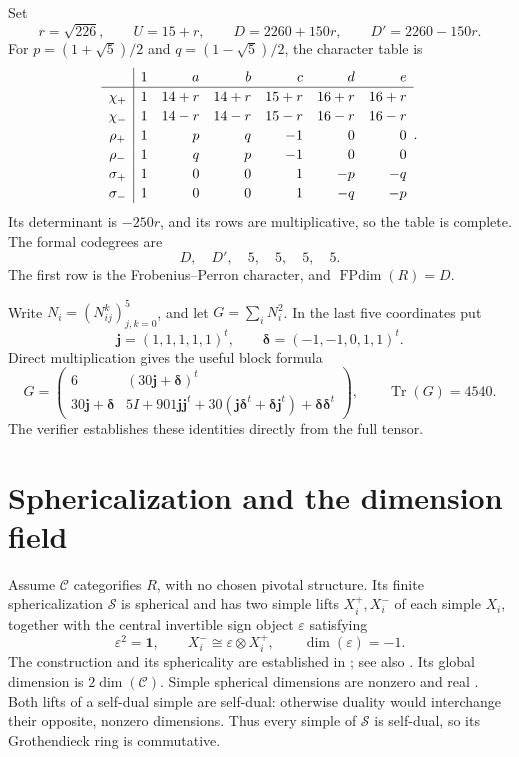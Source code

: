 \documentclass[11pt]{article}
\theoremstyle{remark}\newtheorem{remark}[theorem]{Remark}
\newcommand{\one}{\mathbf1}\newcommand{\jv}{\boldsymbol{j}}\newcommand{\dd}{\boldsymbol{\delta}}
\newcommand{\FPdim}{\operatorname{FPdim}}\newcommand{\Irr}{\operatorname{Irr}}\newcommand{\Tr}{\operatorname{Tr}}
\begin{document}
Set
\[
r=\sqrt{226},\qquad U=15+r,\qquad D=2260+150r,\qquad D'=2260-150r.
\]
For $p=(1+\sqrt5)/2$ and $q=(1-\sqrt5)/2$, the character table is
\begin{equation}\label{eq:characters}
\renewcommand{\arraystretch}{1.15}
\begin{array}{c|rrrrrr}
&1&a&b&c&d&e\\\hline
\chi_+&1&14+r&14+r&15+r&16+r&16+r\\
\chi_-&1&14-r&14-r&15-r&16-r&16-r\\
\rho_+&1&p&q&-1&0&0\\
\rho_-&1&q&p&-1&0&0\\
\sigma_+&1&0&0&1&-p&-q\\
\sigma_-&1&0&0&1&-q&-p
\end{array}.
\end{equation}
Its determinant is $-250r$, and its rows are multiplicative, so the table is complete. The formal codegrees are
\begin{equation}\label{eq:codegrees}
D,\quad D',\quad 5,\quad5,\quad5,\quad5.
\end{equation}
The first row is the Frobenius--Perron character, and $\FPdim(R)=D$.

Write $N_i=(N_{ij}^k)_{j,k=0}^5$, and let $G=\sum_iN_i^2$. In the last five coordinates put
\[
\jv=(1,1,1,1,1)^t,\qquad \dd=(-1,-1,0,1,1)^t.
\]
Direct multiplication gives the useful block formula
\begin{equation}\label{eq:G}
G=\begin{pmatrix}
6&(30\jv+\dd)^t\\
30\jv+\dd&5I+901\jv\jv^t+30(\jv\dd^t+\dd\jv^t)+\dd\dd^t
\end{pmatrix},
\qquad \Tr(G)=4540.
\end{equation}
The verifier establishes these identities directly from the full tensor.

\section{Sphericalization and the dimension field}
Assume $\mathcal C$ categorifies $R$, with no chosen pivotal structure. Its finite sphericalization $\mathcal S$ is spherical and has two simple lifts $X_i^+,X_i^-$ of each simple $X_i$, together with the central invertible sign object $\varepsilon$ satisfying
\[
\varepsilon^2=\one,\qquad X_i^-\cong\varepsilon\otimes X_i^+,\qquad\dim(\varepsilon)=-1.
\]
The construction and its sphericality are established in \cite[Corollary 7.6]{ENOR}; see also \cite[Section 5.1]{O}. Its global dimension is $2\dim(\mathcal C)$. Simple spherical dimensions are nonzero and real \cite[Section 2.1 and Corollary 2.10]{ENO}. Both lifts of a self-dual simple are self-dual: otherwise duality would interchange their opposite, nonzero dimensions. Thus every simple of $\mathcal S$ is self-dual, so its Grothendieck ring is commutative.
\end{document}
